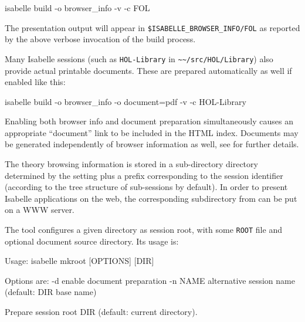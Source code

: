 \begin{isabellebody}
\begin{isamarkuptext}
\begin{ttbox}
isabelle build -o browser_info -v -c FOL
\end{ttbox}

  The presentation output will appear in \verb|$ISABELLE_BROWSER_INFO/FOL| as reported by the above verbose
  invocation of the build process.

  Many Isabelle sessions (such as \verb|HOL-Library| in \verb|~~/src/HOL/Library|) also provide actual printable documents.
  These are prepared automatically as well if enabled like this:
\begin{ttbox}
isabelle build -o browser_info -o document=pdf -v -c HOL-Library
\end{ttbox}

  Enabling both browser info and document preparation simultaneously
  causes an appropriate ``document'' link to be included in the HTML
  index.  Documents may be generated independently of browser
  information as well, see  for further
  details.

  \bigskip The theory browsing information is stored in a
  sub-directory directory determined by the \hyperlink{setting.ISABELLE-BROWSER-INFO}{\mbox{}} setting plus a prefix corresponding to the
  session identifier (according to the tree structure of sub-sessions
  by default).  In order to present Isabelle applications on the web,
  the corresponding subdirectory from \hyperlink{setting.ISABELLE-BROWSER-INFO}{\mbox{}}
  can be put on a WWW server.%
\end{isamarkuptext}%
\isamarkuptrue%
%
\isamarkuptrue%
%
\begin{isamarkuptext}%
The \hypertarget{tool.mkroot}{\hyperlink{tool.mkroot}{\mbox{}}} tool configures a given directory as
  session root, with some \verb|ROOT| file and optional document
  source directory.  Its usage is:
\begin{ttbox}
Usage: isabelle mkroot [OPTIONS] [DIR]

  Options are:
    -d           enable document preparation
    -n NAME      alternative session name (default: DIR base name)

  Prepare session root DIR (default: current directory).
\end{ttbox}


\end{isamarkuptext}
\end{isabellebody}
